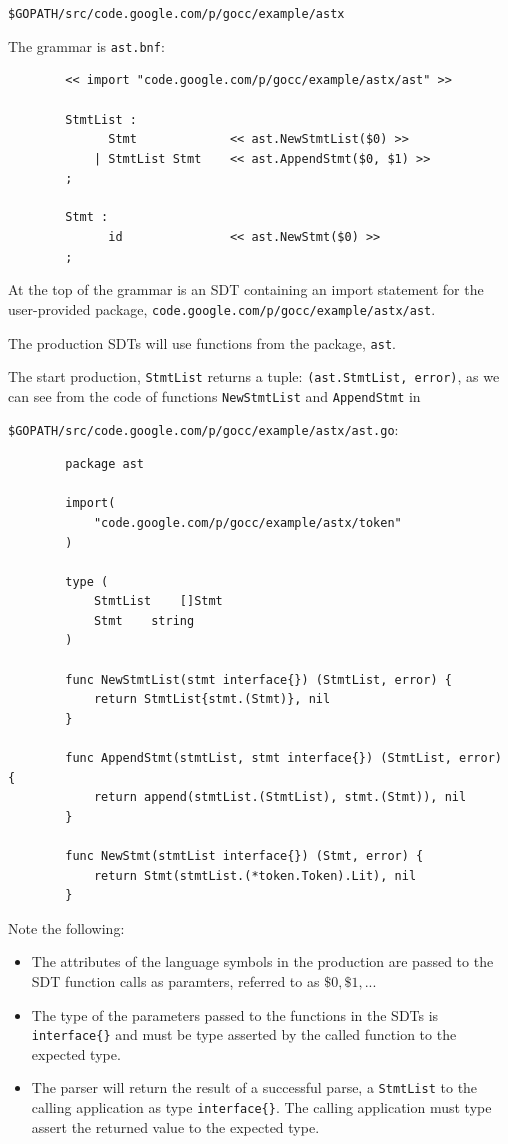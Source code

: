 \documentclass[12pt]{article}
\begin{document}
	\verb|$GOPATH/src/code.google.com/p/gocc/example/astx|

	The grammar is \verb|ast.bnf|:

	\begin{verbatim}
		<< import "code.google.com/p/gocc/example/astx/ast" >>

		StmtList : 
		      Stmt             << ast.NewStmtList($0) >>
		    | StmtList Stmt    << ast.AppendStmt($0, $1) >>
		;

		Stmt : 
		      id               << ast.NewStmt($0) >>
		;
	\end{verbatim}

	At the top of the grammar is an SDT containing an import statement for the user-provided package, 
	\verb|code.google.com/p/gocc/example/astx/ast|.

	The production SDTs will use functions from the package, \verb|ast|.

	The start production, \verb"StmtList" returns a tuple: \verb|(ast.StmtList, error)|, as we can see from the code of functions 
	\verb|NewStmtList| and \verb|AppendStmt| in 

	\verb|$GOPATH/src/code.google.com/p/gocc/example/astx/ast.go|:

	\begin{verbatim}
		package ast

		import(
		    "code.google.com/p/gocc/example/astx/token"
		)

		type (
		    StmtList	[]Stmt
		    Stmt 	string
		)

		func NewStmtList(stmt interface{}) (StmtList, error) {
		    return StmtList{stmt.(Stmt)}, nil
		}

		func AppendStmt(stmtList, stmt interface{}) (StmtList, error) {
		    return append(stmtList.(StmtList), stmt.(Stmt)), nil
		}	

		func NewStmt(stmtList interface{}) (Stmt, error) {
		    return Stmt(stmtList.(*token.Token).Lit), nil
		}
	\end{verbatim}

	Note the following:

	\begin{itemize}
		\item The attributes of the language symbols in the production are passed to the SDT function calls as paramters, referred to as $\$0, \$1, ...$

		\item The type of the parameters passed to the functions in the SDTs is \verb|interface{}| and must be type asserted by the called function to the expected type.

		\item The parser will return the result of a successful parse, a \verb"StmtList" to the calling application as type \verb"interface{}". The calling application must type assert the returned value to the expected type.
	\end{itemize}
\end{document}
